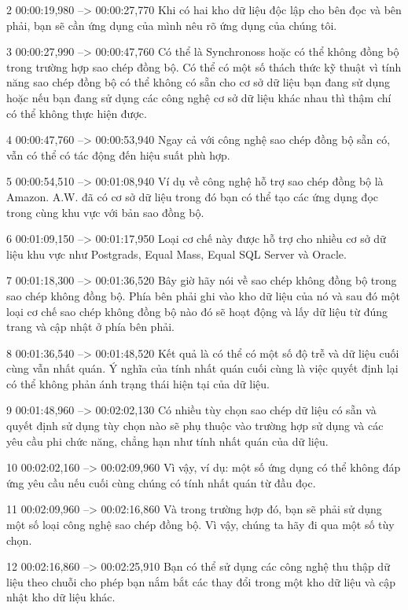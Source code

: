2
00:00:19,980 --> 00:00:27,770
Khi có hai kho dữ liệu độc lập cho bên đọc và bên phải, bạn sẽ cần ứng dụng của mình nêu rõ ứng dụng của chúng tôi.

3
00:00:27,990 --> 00:00:47,760
Có thể là Synchronoss hoặc có thể không đồng bộ trong trường hợp sao chép đồng bộ.  Có thể có một số thách thức kỹ thuật vì tính năng sao chép đồng bộ có thể không có sẵn cho cơ sở dữ liệu bạn đang sử dụng hoặc nếu bạn đang sử dụng các công nghệ cơ sở dữ liệu khác nhau thì thậm chí có thể không thực hiện được.

4
00:00:47,760 --> 00:00:53,940
Ngay cả với công nghệ sao chép đồng bộ sẵn có, vẫn có thể có tác động đến hiệu suất phù hợp.

5
00:00:54,510 --> 00:01:08,940
Ví dụ về công nghệ hỗ trợ sao chép đồng bộ là Amazon.  A.W.  đã có cơ sở dữ liệu trong đó bạn có thể tạo các ứng dụng đọc trong cùng khu vực với bản sao đồng bộ.

6
00:01:09,150 --> 00:01:17,950
Loại cơ chế này được hỗ trợ cho nhiều cơ sở dữ liệu khu vực như Postgrads, Equal Mass, Equal SQL Server và Oracle.

7
00:01:18,300 --> 00:01:36,520
Bây giờ hãy nói về sao chép không đồng bộ trong sao chép không đồng bộ.  Phía bên phải ghi vào kho dữ liệu của nó và sau đó một loại cơ chế sao chép không đồng bộ nào đó sẽ hoạt động và lấy dữ liệu từ đúng trang và cập nhật ở phía bên phải.

8
00:01:36,540 --> 00:01:48,520
Kết quả là có thể có một số độ trễ và dữ liệu cuối cùng vẫn nhất quán.  Ý nghĩa của tính nhất quán cuối cùng là việc quyết định lại có thể không phản ánh trạng thái hiện tại của dữ liệu.

9
00:01:48,960 --> 00:02:02,130
Có nhiều tùy chọn sao chép dữ liệu có sẵn và quyết định sử dụng tùy chọn nào sẽ phụ thuộc vào trường hợp sử dụng và các yêu cầu phi chức năng, chẳng hạn như tính nhất quán của dữ liệu.

10
00:02:02,160 --> 00:02:09,960
Vì vậy, ví dụ: một số ứng dụng có thể không đáp ứng yêu cầu nếu cuối cùng chúng có tính nhất quán từ đầu đọc.

11
00:02:09,960 --> 00:02:16,860
Và trong trường hợp đó, bạn sẽ phải sử dụng một số loại công nghệ sao chép đồng bộ.  Vì vậy, chúng ta hãy đi qua một số tùy chọn.

12
00:02:16,860 --> 00:02:25,910
Bạn có thể sử dụng các công nghệ thu thập dữ liệu theo chuỗi cho phép bạn nắm bắt các thay đổi trong một kho dữ liệu và cập nhật kho dữ liệu khác.

